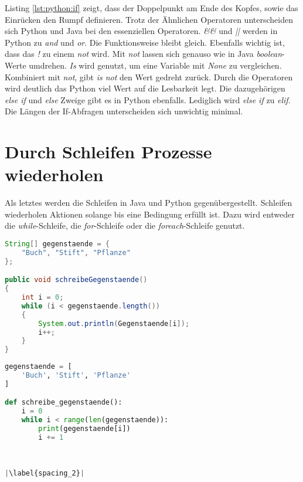 Listing \ref{lst:python:if} zeigt, dass der Doppelpunkt am Ende des Kopfes, sowie das Einrücken den Rumpf definieren.
Trotz der Ähnlichen Operatoren unterscheiden sich Python und Java bei den essenziellen Operatoren. \textit{\&\&} und \textit{||} werden in Python zu \textit{and} und \textit{or}. Die Funktionsweise bleibt gleich. Ebenfalls wichtig ist, dass das \textit{!} zu einem \textit{not} wird. Mit \textit{not} lassen sich genauso wie in Java \textit{boolean}-Werte umdrehen. \textit{Is} wird genutzt, um eine Variable mit \textit{None} zu vergleichen. Kombiniert mit \textit{not}, gibt \textit{is not} den Wert gedreht zurück. Durch die Operatoren wird deutlich das Python viel Wert auf die Lesbarkeit legt.
Die dazugehörigen \textit{else if} und \textit{else} Zweige gibt es in Python ebenfalls. Lediglich wird \textit{else if} zu \textit{elif}.  Die Längen der If-Abfragen unterscheiden sich unwichtig minimal.\cite{Python3:Buch}\cite{Louis:2010}\par

\section{Durch Schleifen Prozesse wiederholen}
Als letztes werden die Schleifen in Java und Python gegenübergestellt. Schleifen wiederholen Aktionen solange bis eine Bedingung erfüllt ist. Dazu wird entweder die \textit{while}-Schleife, die \textit{for}-Schleife oder die \textit{foreach}-Schleife genutzt.

\begin{minipage}{.5\linewidth}
\begin{lstlisting}[language=java,caption={while-Schleife Java},captionpos=b,label={lst:java:while},frame=none]
String[] gegenstaende = {
    "Buch", "Stift", "Pflanze"
};

public void schreibeGegenstaende()
{
    int i = 0;
    while (i < gegenstaende.length())
    {
        System.out.println(Gegenstaende[i]);
        i++;
    }
}
\end{lstlisting}
\end{minipage}
\begin{minipage}{.5\linewidth}
\begin{lstlisting}[language=python,caption={while-Schleife Python},captionpos=b,label={lst:python:while},frame=l,escapechar=|]
gegenstaende = [
    'Buch', 'Stift', 'Pflanze'
]

def schreibe_gegenstaende():
    i = 0
    while i < range(len(gegenstaende)):
        print(gegenstaende[i])
        i += 1
        
        

|\label{spacing_2}|
\end{lstlisting}
\end{minipage}

